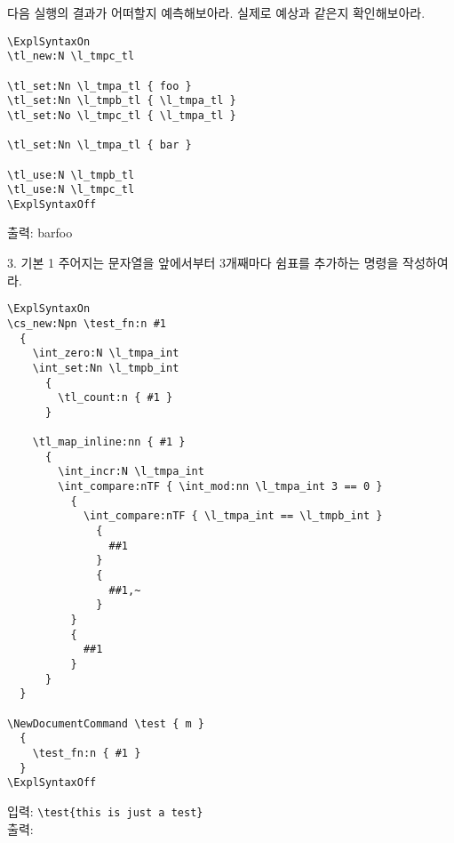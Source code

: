 \documentclass[a4paper,amsmath,itemph]{oblivoir}
\begin{document}
\begin{questiona}{3}
  다음 실행의 결과가 어떠할지 예측해보아라.
  실제로 예상과 같은지 확인해보아라.

  \tcblower

  \begin{verbatim}
\ExplSyntaxOn
\tl_new:N \l_tmpc_tl

\tl_set:Nn \l_tmpa_tl { foo }
\tl_set:Nn \l_tmpb_tl { \l_tmpa_tl }
\tl_set:No \l_tmpc_tl { \l_tmpa_tl }

\tl_set:Nn \l_tmpa_tl { bar }

\tl_use:N \l_tmpb_tl
\tl_use:N \l_tmpc_tl
\ExplSyntaxOff
  \end{verbatim}

  \begin{tcolorbox}{}
    출력: barfoo
  \end{tcolorbox}

\end{questiona}


\begin{questionp}{3. 기본 1}
  주어지는 문자열을 앞에서부터 3개째마다 쉼표를 추가하는 명령을 작성하여라.

  \tcblower

  \begin{verbatim}
\ExplSyntaxOn
\cs_new:Npn \test_fn:n #1
  {
    \int_zero:N \l_tmpa_int
    \int_set:Nn \l_tmpb_int
      {
        \tl_count:n { #1 }
      }

    \tl_map_inline:nn { #1 }
      {
        \int_incr:N \l_tmpa_int
        \int_compare:nTF { \int_mod:nn \l_tmpa_int 3 == 0 }
          {
            \int_compare:nTF { \l_tmpa_int == \l_tmpb_int }
              {
                ##1
              }
              {
                ##1,~
              }
          }
          {
            ##1
          }
      }
  }

\NewDocumentCommand \test { m }
  {
    \test_fn:n { #1 }
  }
\ExplSyntaxOff
  \end{verbatim}

  \begin{tcolorbox}{}
    입력: \verb|\test{this is just a test}|\\
    출력: 
  \end{tcolorbox}
\end{questionp}
\end{document}
